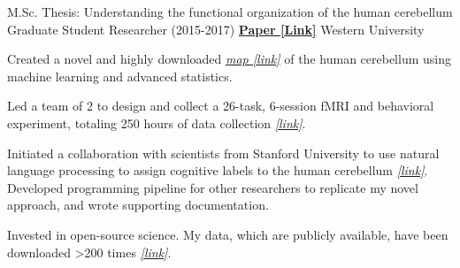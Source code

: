 \begin{cventries}
  \cventry
    {M.Sc. Thesis: Understanding the functional organization of the human cerebellum}
    {Graduate Student Researcher (2015-2017)} %
    {\href{http://ivrylab.berkeley.edu/uploads/4/1/1/5/41152143/functional_boundaries_in_the_human_cerebellum.pdf}{\textbf{Paper [Link]}}}
    {Western University} %
    {
      \begin{cvitems} %
        \item {Created a novel and highly downloaded {\href{http://www.diedrichsenlab.org/imaging/mdtb.htm}{\textit{ map [link]}}} of the human cerebellum using machine learning and advanced statistics.}
      	\item {Led a team of 2 to design and collect a 26-task, 6-session fMRI and behavioral experiment, totaling 250 hours of data collection {\href{http://www.diedrichsenlab.org/imaging/AtlasViewer/viewer.html}{\textit{[link]}}}.}
      	\item {Initiated a collaboration with scientists from Stanford University to use natural language processing to assign cognitive labels to the human cerebellum {\href{https://cognitiveatlas.org/}{\textit{[link]}}}. Developed programming pipeline for other researchers to replicate my novel approach, and wrote supporting documentation.}
      	\item {Invested in open-source science. My data, which are publicly available, have been downloaded >200 times {\href{https://openneuro.org/datasets/ds002105/versions/1.1.0}{\textit{[link]}}}.}
      \end{cvitems}
    }

\end{cventries}
